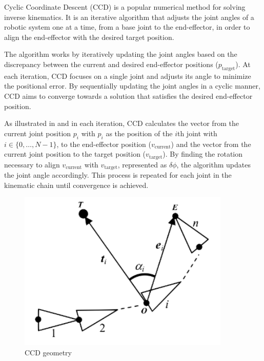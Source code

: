 Cyclic Coordinate Descent (CCD) is a popular numerical method for solving inverse kinematics. It is an iterative algorithm that adjusts the joint angles of a robotic system one at a time, from a base joint to the end-effector, in order to align the end-effector with the desired target position.

The algorithm works by iteratively updating the joint angles based on the discrepancy between the current and desired end-effector positions ($p_\text{target}$). At each iteration, CCD focuses on a single joint and adjusts its angle to minimize the positional error. By sequentially updating the joint angles in a cyclic manner, CCD aims to converge towards a solution that satisfies the desired end-effector position.



As illustrated in  and  in each iteration, CCD calculates the vector from the current joint position $p_i$ with $p_i$ as the position of the $i$th joint with $i \in \{0, \ldots, N-1\}$, to the end-effector position ($v_\text{current}$) and the vector from the current joint position to the target position ($v_\text{target}$). By finding the rotation necessary to align $v_\text{current}$ with $v_\text{target}$, represented as $\delta\phi$, the algorithm updates the joint angle accordingly. This process is repeated for each joint in the kinematic chain until convergence is achieved.

\begin{figure}[ht]
	\centering
	\includegraphics[width=0.9\textwidth,]{figures/background/CCD-geometry.png}
	\caption{CCD geometry}
	\label{fig:background/CCD geometry}
\end{figure}

